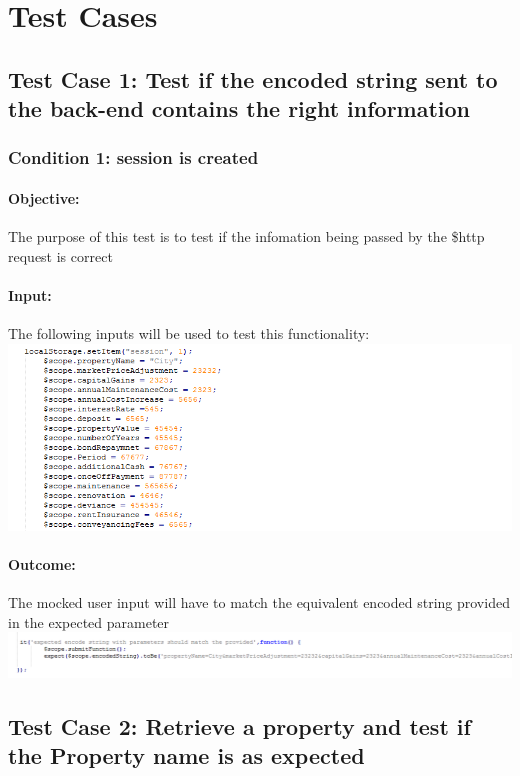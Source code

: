 \documentclass[a4paper,12pt]{article}
\begin{document}
\section{Test Cases}
\subsection{Test Case 1: Test if the encoded string sent to the back-end contains the right information}
\subsubsection{Condition 1: session is created}
\paragraph{Objective:}The purpose of this test is to test if the infomation being passed by the \$http request is correct 
\paragraph{Input:}The following inputs will be used to test this functionality:\\
\includegraphics[width=1\textwidth]{./Images/input.png}

\paragraph{Outcome: }The mocked user input will have to match the equivalent encoded string provided in the expected parameter\\
\includegraphics[width=1\textwidth]{./Images/expectedCase1.png}

\subsection{Test Case 2: Retrieve a property and test if the Property name is as expected}
\end{document}
